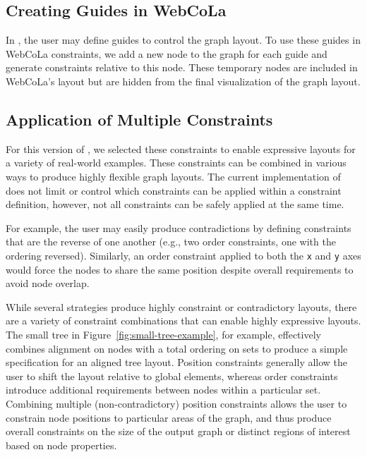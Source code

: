 \subsection{Creating Guides in WebCoLa}

In \projectname, the user may define guides to control the graph layout.
To use these guides in WebCoLa constraints, we add a new node to the graph
for each guide and generate constraints relative to this node. These 
temporary nodes are included in WebCoLa's layout but are hidden from the
final visualization of the graph layout.

\subsection{Application of Multiple Constraints}
For this version of \projectname, we selected these constraints to enable
expressive layouts for a variety of real-world examples. These constraints
can be combined in various ways to produce highly flexible graph layouts.
The current implementation of \projectname does not limit or control which
constraints can be applied within a constraint definition, however, not
all constraints can be safely applied at the same time.

For example, the user may easily produce contradictions by defining constraints
that are the reverse of one another (e.g., two order constraints, one with the
ordering reversed). Similarly, an order constraint applied to both the \texttt{x}
and \texttt{y} axes would force the nodes to share the same position despite
overall requirements to avoid node overlap. 

While several strategies produce highly constraint or contradictory layouts, 
there are a variety of constraint combinations that can enable highly 
expressive layouts. The small tree in Figure~\ref{fig:small-tree-example}, for 
example, effectively combines alignment on nodes with a total ordering on sets 
to produce a simple specification for an aligned tree layout. Position constraints
generally allow the user to shift the layout relative to global elements,
whereas order constraints introduce additional requirements between nodes
within a particular set. Combining multiple (non-contradictory) position
constraints allows the user to constrain node positions to particular
areas of the graph, and thus produce overall constraints on the size of the
output graph or distinct regions of interest based on node properties.

